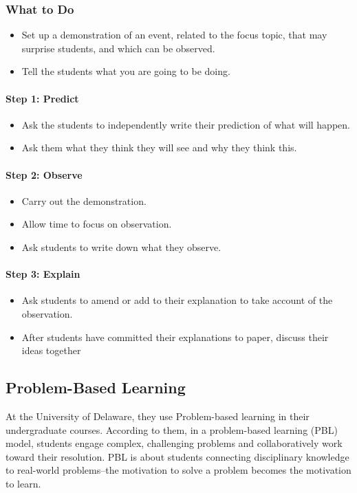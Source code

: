 \subsubsection*{What to Do}
\begin{itemize}
\item Set up a demonstration of an event, related to the focus topic, that may surprise students,
and which can be observed.
\item Tell the students what you are going to be doing.
\end{itemize}
\paragraph*{Step 1: Predict}
\begin{itemize}
\item Ask the students to independently write their prediction of what will happen.
\item Ask them what they think they will see and why they think this.
\end{itemize}
\paragraph*{Step 2: Observe}
\begin{itemize}
\item Carry out the demonstration.
\item Allow time to focus on observation.
\item Ask students to write down what they observe.
\end{itemize}
\paragraph*{Step 3: Explain}
\begin{itemize}
\item Ask students to amend or add to their explanation to take account of the observation.
\item After students have committed their explanations to paper, discuss their ideas together
\end{itemize}
\subsection*{Problem-Based Learning}
At the University of Delaware, they use Problem-based learning in their undergraduate
courses. According to them, in a problem-based learning (PBL) model, students engage complex,
challenging problems and collaboratively work toward their resolution. PBL is about students
connecting disciplinary knowledge to real-world problems--the motivation to solve a problem
becomes the motivation to learn.

